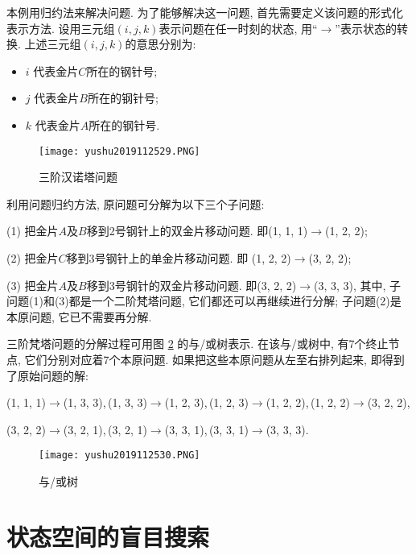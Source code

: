 \begin{answer}
本例用归约法来解决问题.
为了能够解决这一问题, 首先需要定义该问题的形式化表示方法.
设用三元组$(i, j, k)$表示问题在任一时刻的状态, 用“$\rightarrow$”表示状态的转换. 上述三元组$(i, j, k)$的意思分别为:
\begin{itemize}
    \item $i$ 代表金片$C$所在的钢针号;
    \item $j$ 代表金片$B$所在的钢针号;
    \item $k$ 代表金片$A$所在的钢针号.
\end{itemize}
\begin{figure}[H]
    \centering
    \texttt{[image: yushu2019112529.PNG]}
    \caption{三阶汉诺塔问题 }
    \label{AI32fig29}
\end{figure}
利用问题归约方法, 原问题可分解为以下三个子问题:

(1) 把金片$A$及$B$移到2号钢针上的双金片移动问题. 即(1, 1, 1)$\rightarrow$(1, 2, 2);

(2) 把金片$C$移到3号钢针上的单金片移动问题. 即 (1, 2, 2)$\rightarrow$(3, 2, 2);

(3) 把金片$A$及$B$移到3号钢针的双金片移动问题. 即(3, 2, 2)$\rightarrow$(3, 3, 3), 其中, 子问题(1)和(3)都是一个二阶梵塔问题, 它们都还可以再继续进行分解; 子问题(2)是本原问题, 它已不需要再分解.

三阶梵塔问题的分解过程可用图 \ref{AI32fig2019120230} 的与/或树表示.
在该与/或树中, 有7个终止节点, 它们分别对应着7个本原问题. 如果把这些本原问题从左至右排列起来, 即得到了原始问题的解:
\begin{center}
(1, 1, 1)$\rightarrow$(1, 3, 3),\,(1, 3, 3)$\rightarrow$(1, 2, 3),\,(1, 2, 3)$\rightarrow$(1, 2, 2),\,(1, 2, 2)$\rightarrow$(3, 2, 2),

(3, 2, 2)$\rightarrow$(3, 2, 1),\,(3, 2, 1)$\rightarrow$(3, 3, 1),\,(3, 3, 1)$\rightarrow$(3, 3, 3).
\end{center}
\begin{figure}[H]
    \centering
    \texttt{[image: yushu2019112530.PNG]}
    \caption{与/或树 }
    \label{AI32fig2019120230}
\end{figure}
\end{answer}
\section{状态空间的盲目搜索}
